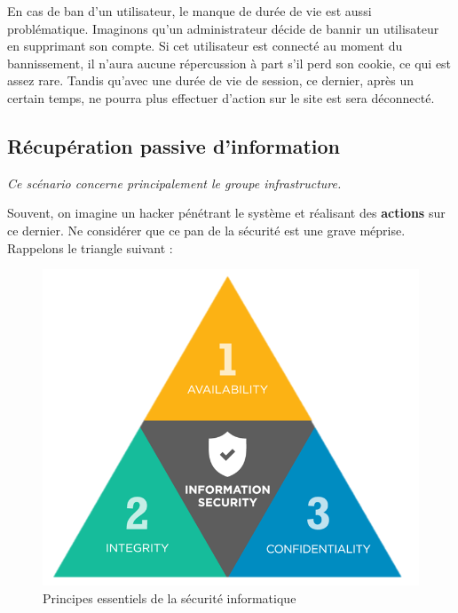 \documentclass[12pt]{article}
\begin{document}
En cas de ban d'un utilisateur, le manque de durée de vie est aussi problématique. Imaginons qu'un administrateur décide de bannir un utilisateur en supprimant son compte. Si cet utilisateur est connecté au moment du bannissement, il n'aura aucune répercussion à part s'il perd son cookie, ce qui est assez rare. Tandis qu'avec une durée de vie de session, ce dernier, après un certain temps, ne pourra plus effectuer d'action sur le site est sera déconnecté.


\subsection{Récupération passive d'information}

\emph{Ce scénario concerne principalement le groupe infrastructure.}
\medskip

Souvent, on imagine un hacker pénétrant le système et réalisant des \textbf{actions} sur ce dernier. Ne considérer que ce pan de la sécurité est une grave méprise. Rappelons le triangle suivant :

\begin{figure}[h]
\begin{center}
\includegraphics[width=.6\textwidth]{CAI.png}
\caption{Principes essentiels de la sécurité informatique}
\label{cia}
\end{center}
\end{figure}
\end{document}
